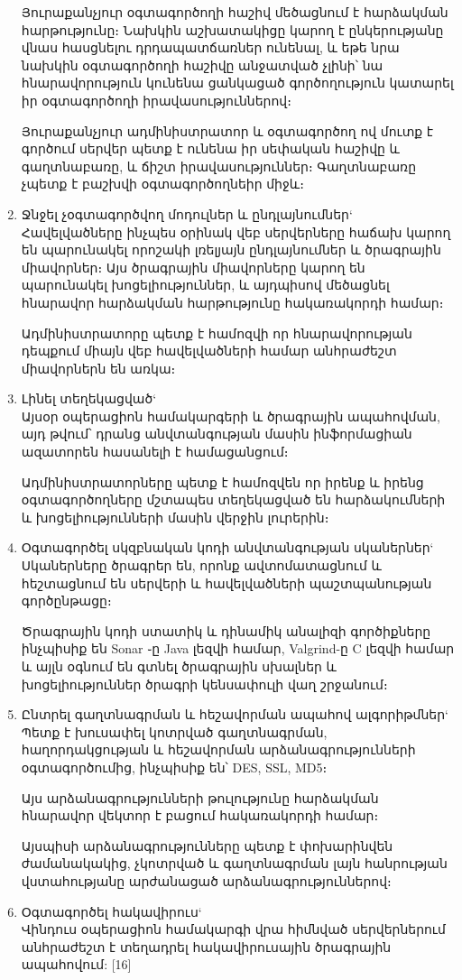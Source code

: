 \documentclass[12pt]{article}
\begin{document}
\begin{sloppypar}
\begin{enumerate}
	Յուրաքանչյուր օգտագործողի հաշիվ մեծացնում է հարձակման հարթությունը։
	Նախկին աշխատակիցը կարող է ընկերությանը վնաս հասցնելու դրդապատճառներ
	ունենալ, և եթե նրա նախկին օգտագործողի հաշիվը անջատված չլինի՝
	նա հնարավորություն կունենա ցանկացած գործողություն կատարել
	իր օգտագործողի իրավասություններով։

    Յուրաքանչյուր ադմինիստրատոր և օգտագործող ով մուտք է գործում
    սերվեր պետք է ունենա իր սեփական հաշիվը և գաղտնաբառը, և ճիշտ
    իրավասություններ։ Գաղտնաբառը չպետք է բաշխվի օգտագործողնեիր միջև։
\item Ջնջել չօգտագործվող մոդուլներ և ընդլայնումներ`\\
    Հավելվածները ինչպես օրինակ վեբ սերվերները հաճախ կարող են պարունակել
    որոշակի լռելյայն ընդլայնումներ և ծրագրային միավորներ։
    Այս ծրագրային միավորները կարող են պարունակել խոցելիություններ, և
    այդպիսով մեծացնել հնարավոր հարձակման հարթությունը հակառակորդի համար։

    Ադմինիստրատորը պետք է համոզվի որ հնարավորության դեպքում միայն
    վեբ հավելվածների համար անհրաժեշտ միավորներն են առկա։
\item Լինել տեղեկացված`\\
    Այսօր օպերացիոն համակարգերի և ծրագրային ապահովման,
    այդ թվում՝ դրանց անվտանգության մասին ինֆորմացիան ազատորեն հասանելի է
    համացանցում։

    Ադմինիստրատորները պետք է համոզվեն որ իրենք և իրենց օգտագործողները
    մշտապես տեղեկացված են հարձակումների և խոցելիությունների մասին
    վերջին լուրերին։
\item Օգտագործել սկզբնական կոդի անվտանգության սկաներներ`\\
    Սկաներները ծրագրեր են, որոնք ավտոմատացնում և հեշտացնում են սերվերի
    և հավելվածների պաշտպանության գործընթացը։

    Ծրագրային կոդի ստատիկ և դինամիկ անալիզի գործիքները ինչպիսիք են
    Sonar ֊ը Java լեզվի համար, Valgrind-ը C լեզվի համար և այլն
    օգնում են գտնել ծրագրային սխալներ և խոցելիություններ ծրագրի
    կենսափուլի վաղ շրջանում։
\item Ընտրել գաղտնագրման և հեշավորման ապահով ալգորիթմներ`\\
    Պետք է խուսափել կոտրված գաղտնագրման, հաղորդակցության և
    հեշավորման արձանագրությունների օգտագործումից, ինչպիսիք են՝
	DES, SSL, MD5։

    Այս արձանագրությունների թուլությունը հարձակման հնարավոր
    վեկտոր է բացում հակառակորդի համար։

    Այսպիսի արձանագրությունները պետք է փոխարինվեն ժամանակակից,
    չկոտրված և գաղտնագրման լայն հանրության վստահությանը արժանացած
    արձանագրություններով։
\item Օգտագործել հակավիրուս`\\
	Վինդուս օպերացիոն համակարգի վրա հիմնված սերվերներում անհրաժեշտ է տեղադրել
	հակավիրուսային ծրագրային ապահովում: [16]


\end{enumerate}
\end{sloppypar}
\end{document}
